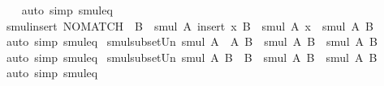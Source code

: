 \begin{isabellebody}
%
\isadelimproof
\ \ %
\endisadelimproof
%
\isatagproof
{}\isamarkupfalse%
\ {\isacharparenleft}{\kern0pt}auto\ simp{\isacharcolon}{\kern0pt}\ smul{\isacharunderscore}{\kern0pt}eq{\isacharparenright}{\kern0pt}%
\endisatagproof
{\isafoldproof}%
%
\isadelimproof
\isanewline
%
\endisadelimproof
\isanewline
{}\isamarkupfalse%
\ smul{\isacharunderscore}{\kern0pt}insert{}{\isacharcolon}{\kern0pt}\ {\isachardoublequoteopen}NO{\isacharunderscore}{\kern0pt}MATCH\ {\isacharbraceleft}{\kern0pt}{\isacharbraceright}{\kern0pt}\ B\ {\isasymLongrightarrow}\ smul\ A\ {\isacharparenleft}{\kern0pt}insert\ x\ B{\isacharparenright}{\kern0pt}\ {\isacharequal}{\kern0pt}\ smul\ A\ {\isacharbraceleft}{\kern0pt}x{\isacharbraceright}{\kern0pt}\ {\isasymunion}\ smul\ A\ B{\isachardoublequoteclose}\isanewline
%
\isadelimproof
\ \ %
\endisadelimproof
%
\isatagproof
{}\isamarkupfalse%
\ {\isacharparenleft}{\kern0pt}auto\ simp{\isacharcolon}{\kern0pt}\ smul{\isacharunderscore}{\kern0pt}eq{\isacharparenright}{\kern0pt}%
\endisatagproof
{\isafoldproof}%
%
\isadelimproof
\isanewline
%
\endisadelimproof
\isanewline
{}\isamarkupfalse%
\ smul{\isacharunderscore}{\kern0pt}subset{\isacharunderscore}{\kern0pt}Un{}{\isacharcolon}{\kern0pt}\ {\isachardoublequoteopen}smul\ {\isacharparenleft}{\kern0pt}A\ {\isasymunion}\ A{\isacharprime}{\kern0pt}{\isacharparenright}{\kern0pt}\ B\ {\isacharequal}{\kern0pt}\ smul\ A\ B\ {\isasymunion}\ smul\ A{\isacharprime}{\kern0pt}\ B{\isachardoublequoteclose}\isanewline
%
\isadelimproof
\ \ %
\endisadelimproof
%
\isatagproof
{}\isamarkupfalse%
\ {\isacharparenleft}{\kern0pt}auto\ simp{\isacharcolon}{\kern0pt}\ smul{\isacharunderscore}{\kern0pt}eq{\isacharparenright}{\kern0pt}%
\endisatagproof
{\isafoldproof}%
%
\isadelimproof
\isanewline
%
\endisadelimproof
\isanewline
{}\isamarkupfalse%
\ smul{\isacharunderscore}{\kern0pt}subset{\isacharunderscore}{\kern0pt}Un{}{\isacharcolon}{\kern0pt}\ {\isachardoublequoteopen}smul\ A\ {\isacharparenleft}{\kern0pt}B\ {\isasymunion}\ B{\isacharprime}{\kern0pt}{\isacharparenright}{\kern0pt}\ {\isacharequal}{\kern0pt}\ smul\ A\ B\ {\isasymunion}\ smul\ A\ B{\isacharprime}{\kern0pt}{\isachardoublequoteclose}\isanewline
%
\isadelimproof
\ \ %
\endisadelimproof
%
\isatagproof
{}\isamarkupfalse%
\ {\isacharparenleft}{\kern0pt}auto\ simp{\isacharcolon}{\kern0pt}\ smul{\isacharunderscore}{\kern0pt}eq{\isacharparenright}{\kern0pt}%
\endisatagproof
{\isafoldproof}%
%
\isadelimproof
\isanewline
%
\endisadelimproof

\end{isabellebody}
